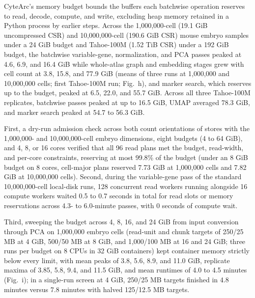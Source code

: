 \label{note:Memory budget compliance}

CyteArc's memory budget bounds the buffers each batchwise operation reserves to read, decode, compute, and write, excluding heap memory retained in a Python process by earlier steps. Across the 1,000,000-cell (19.1 GiB uncompressed CSR) and 10,000,000-cell (190.6 GiB CSR) mouse embryo samples under a 24 GiB budget and Tahoe-100M (1.52 TiB CSR) under a 192 GiB budget, the batchwise variable-gene, normalization, and PCA passes peaked at 4.6, 6.9, and 16.4 GiB while whole-atlas graph and embedding stages grew with cell count at 3.8, 15.8, and 77.9 GiB (means of three runs at 1,000,000 and 10,000,000 cells; first Tahoe-100M run; Fig.~h), and marker search, which reserves up to the budget, peaked at 6.5, 22.0, and 55.7 GiB. Across all three Tahoe-100M replicates, batchwise passes peaked at up to 16.5 GiB, UMAP averaged 78.3 GiB, and marker search peaked at 54.7 to 56.3 GiB.

First, a dry-run admission check across both count orientations of stores with the 1,000,000- and 10,000,000-cell embryo dimensions, eight budgets (4 to 64 GiB), and 4, 8, or 16 cores verified that all 96 read plans met the budget, read-width, and per-core constraints, reserving at most 99.8\% of the budget (under an 8 GiB budget on 8 cores, cell-major plans reserved 7.73 GiB at 1,000,000 cells and 7.82 GiB at 10,000,000 cells). Second, during the variable-gene pass of the standard 10,000,000-cell local-disk runs, 128 concurrent read workers running alongside 16 compute workers waited 0.5 to 0.7 seconds in total for read slots or memory reservations across 4.3- to 6.0-minute passes, with 0 seconds of compute wait.

Third, sweeping the budget across 4, 8, 16, and 24 GiB from input conversion through PCA on 1,000,000 embryo cells (read-unit and chunk targets of 250/25 MB at 4 GiB, 500/50 MB at 8 GiB, and 1,000/100 MB at 16 and 24 GiB; three runs per budget on 8 CPUs in 32 GiB containers) kept container memory strictly below every limit, with mean peaks of 3.8, 5.6, 8.9, and 11.0 GiB, replicate maxima of 3.85, 5.8, 9.4, and 11.5 GiB, and mean runtimes of 4.0 to 4.5 minutes (Fig.~i); in a single-run screen at 4 GiB, 250/25 MB targets finished in 4.8 minutes versus 7.8 minutes with halved 125/12.5 MB targets.

